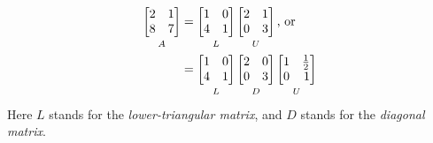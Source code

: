 \documentclass[../main.tex]{subfiles}
\begin{document}
\[
    \begin{aligned}
        \underbracket[0pt][0pt]{
            \begin{bmatrix*}[r]
                2 & 1 \\
                8 & 7
            \end{bmatrix*}
        }_{\mathstrut A}
         & =
        \underbracket[0pt][0pt]{
            \begin{bmatrix*}[r]
                1 & 0 \\
                4 & 1
            \end{bmatrix*}
        }_{\mathstrut L}
        \underbracket[0pt][0pt]{
            \begin{bmatrix*}[r]
                2 & 1 \\
                0 & 3
            \end{bmatrix*}
        }_{\mathstrut U}
        \text{, or} \\
         &
        =
        \underbracket[0pt][0pt]{
            \begin{bmatrix*}[r]
                1 & 0 \\
                4 & 1
            \end{bmatrix*}
        }_{\mathstrut L}
        \underbracket[0pt][0pt]{
            \begin{bmatrix*}[r]
                2 & 0 \\
                0 & 3
            \end{bmatrix*}
        }_{\mathstrut D}
        \underbracket[0pt][0pt]{
            \begin{bmatrix*}[r]
                1 & \frac{1}{2} \\
                0 & 1
            \end{bmatrix*}
        }_{\mathstrut U}
    \end{aligned}
\]
Here \(L\) stands for the \emph{lower-triangular matrix}, and \(D\) stands for the \emph{diagonal matrix}.


\end{document}
